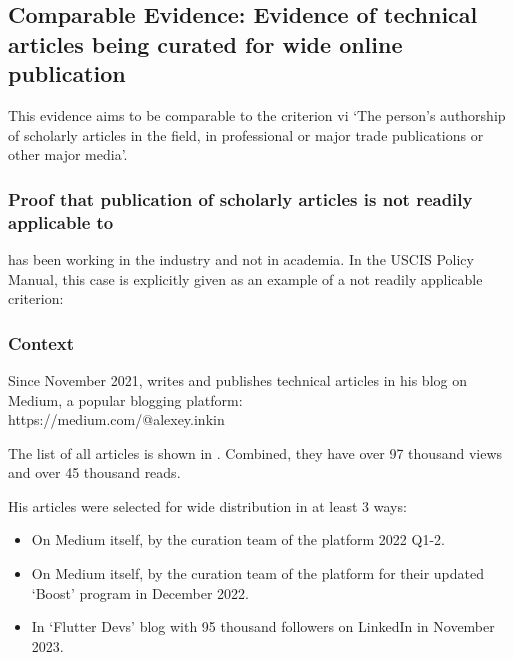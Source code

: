 \subsection{%
    Comparable Evidence: Evidence of \mrls technical articles being curated for wide online publication%
}
\label{subsec:Articles}

This evidence aims to be comparable to the criterion vi
`The person's authorship of scholarly articles in the field,
in professional or major trade publications or other major media'.

\subsubsection{%
    Proof that publication of scholarly articles is not readily applicable to \mrl%
}

\mrl has been working in the industry and not in academia.
In the USCIS Policy Manual, this case is explicitly given as an example
of a not readily applicable criterion:



\subsubsection{%
    Context
}

Since November 2021, \mrl writes and publishes technical articles in his blog on Medium,
a popular blogging platform:\\
https://medium.com/@alexey.inkin

The list of all \mrls articles is shown in .
Combined, they have over 97 thousand views and over 45 thousand reads.

His articles were selected for wide distribution in at least 3 ways:

\begin{itemize}

    \item On Medium itself, by the curation team of the platform 2022 Q1-2.

    \item On Medium itself, by the curation team of the platform for their updated `Boost' program in December 2022.

    \item In `Flutter Devs' blog with 95 thousand followers on LinkedIn in November 2023.

\end{itemize}


